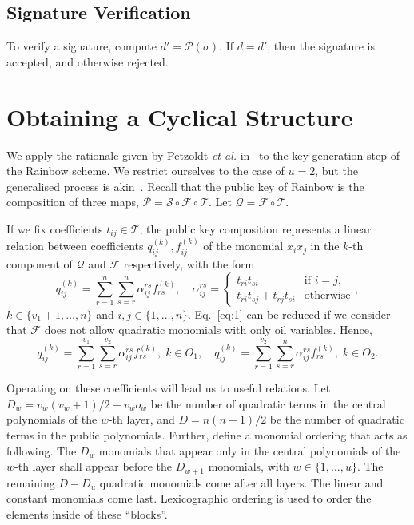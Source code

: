 \documentclass[a4paper, 14pt]{extarticle}
\begin{document}
\subsection{Signature Verification}
To verify a signature, compute $d' = \mathcal{P}(\sigma)$. If $d = d'$, then the signature is accepted, and otherwise rejected.

\section{Obtaining a Cyclical Structure}\label{sec:cyclic}

We apply the rationale given by Petzoldt \emph{et al.} in~\cite{Petzoldt:inproc:2010:jun} to the key generation step of the Rainbow scheme. We restrict ourselves to the case of $u = 2$, but the generalised process is akin~\cite[Section 7.2]{Petzoldt:phd:2013:jul}. Recall that the public key of Rainbow is the composition of three maps, $\mathcal{P} = \mathcal{S} \circ \mathcal{F} \circ \mathcal{T}$. Let $\mathcal{Q} = \mathcal{F} \circ \mathcal{T}$. 

If we fix coefficients $t_{ij} \in \mathcal{T}$, the public key composition represents a linear relation between coefficients $q_{ij}^{(k)}, f_{ij}^{(k)}$ of the monomial $x_{i} x_{j}$ in the $k$-th component of $\mathcal{Q}$ and $\mathcal{F}$ respectively, with the form
\begin{equation}\label{eq:1}
q_{ij}^{(k)} = \sum_{r = 1}^{n} \sum_{s = r}^{n} \alpha_{ij}^{rs} f_{rs}^{(k)}, \quad \alpha_{ij}^{rs} =
\begin{cases}
t_{ri} t_{si}                   & \text{if } i = j, \\
t_{ri} t_{sj} + t_{rj} t_{si}   & \text{otherwise}
\end{cases},
\end{equation}
$k \in \{v_{1} + 1, \dots, n\}$ and $i, j \in \{1, \dots, n\}$. Eq.~\ref{eq:1} can be reduced if we consider that $\mathcal{F}$ does not allow quadratic monomials with only oil variables. Hence,
\begin{equation}\label{eq:2}
    q_{ij}^{(k)} = \sum_{r = 1}^{v_{1}} \sum_{s = r}^{v_{2}} \alpha_{ij}^{rs} f_{rs}^{(k)}, \; k \in O_{1}, \quad    q_{ij}^{(k)} = \sum_{r = 1}^{v_{2}} \sum_{s = r}^{n} \alpha_{ij}^{rs} f_{rs}^{(k)}, \; k \in O_{2}.
\end{equation}

Operating on these coefficients will lead us to useful relations. Let $D_{w} = v_{w}(v_{w} + 1)/2 + v_{w} o_{w}$ be the number of quadratic terms in the central polynomials of the $w$-th layer, and $D = n(n + 1)/2$ be the number of quadratic terms in the public polynomials. Further, define a monomial ordering that acts as following. The $D_{w}$ monomials that appear only in the central polynomials of the $w$-th layer shall appear before the $D_{w + 1}$ monomials, with $w \in \{1, \dots, u\}$. The remaining $D - D_{u}$ quadratic monomials come after all layers. The linear and constant monomials come last. Lexicographic ordering is used to order the elements inside of these ``blocks''.
\end{document}
